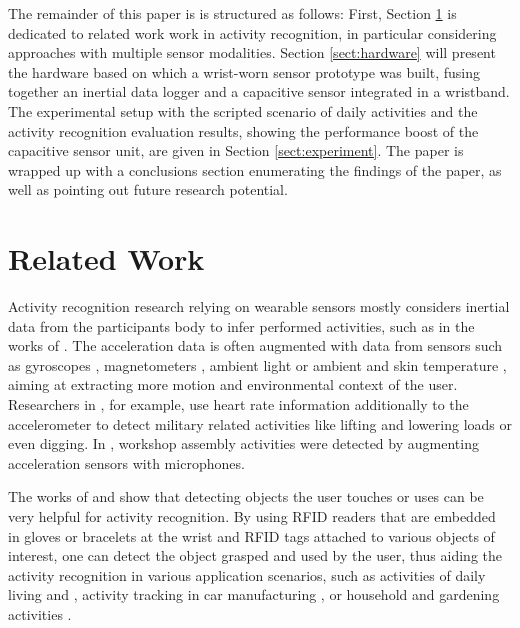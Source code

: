 \documentclass[runningheads,a4paper]{llncs}
\begin{document}

The remainder of this paper is  is structured as follows: First, Section \ref{sect:related} is dedicated to related work work in activity recognition, in particular considering approaches with multiple sensor modalities. Section \ref{sect:hardware} will present the hardware based on which a wrist-worn sensor prototype was built, fusing together an inertial data logger and a capacitive sensor integrated in a wristband. The experimental setup with the scripted scenario of daily activities and the activity recognition evaluation results, showing the performance boost of the capacitive sensor unit, are given in Section \ref{sect:experiment}. The paper is wrapped up with a conclusions section enumerating the findings of the paper, as well as pointing out future research potential.




\section{Related Work}
\label{sect:related}

Activity recognition research relying on wearable sensors mostly considers inertial data from the participants body to infer performed activities, such as in the works of \cite{Ravi2005,Bao2004,Srinivasan2010,Amft2005}. The acceleration data is often augmented with data from sensors such as gyroscopes \cite{Holleczek_2010}, magnetometers \cite{Altun_2010}, ambient light \cite{Borazio2012} or ambient and skin temperature \cite{Krause_2003}, aiming at extracting more motion and environmental context of the user. Researchers in \cite{wyss2010recognition}, for example, use heart rate information additionally to the accelerometer to detect military related activities like lifting and lowering loads or even digging. In \cite{Ward_2006}, workshop assembly activities were detected by augmenting acceleration sensors with microphones.

The works of \cite{Fishkin_2005} and \cite{patterson2005fga} show that detecting objects the user touches or uses can be very helpful for activity recognition. By using RFID readers that are embedded in gloves or bracelets at the wrist and RFID tags attached to various objects of interest, one can detect the object grasped and used by the user, thus aiding the activity recognition in various application scenarios, such as activities of daily living \cite{phealth:maja} and \cite{Philipose_2004}, activity tracking in car manufacturing \cite{Stiefmeier08}, or household and gardening activities \cite{berlin_laerhoven_tei_2010}. 
\end{document}
